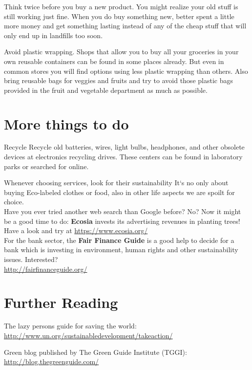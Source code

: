 \begin{suggest}{Think twice before you buy a new product.}
	You might realize your old stuff is still working just fine. When you do buy something new, better spent a little more money and get something lasting instead of any of the cheap stuff that will only end up in landfills too soon. 
\end{suggest} 

\begin{suggest}{Avoid plastic wrapping.}
	Shops that allow you to buy all your groceries in your own reusable containers can be found in some places already. But even in common stores you will find options using less plastic wrapping than others. Also bring reusable bags for veggies and fruits and try to avoid those plastic bags provided in the fruit and vegetable department as much as possible.
\end{suggest}

\section{More things to do}

\begin{suggest}{Recycle}
	Recycle old batteries, wires, light bulbs, headphones, and other obsolete devices at electronics recycling drives. These centers can be found in laboratory parks or searched for online.
\end{suggest}

\begin{suggest}{Whenever choosing services, look for their sustainability}
		It`s no only about buying Eco-labeled clothes or food, also in other life aspects we are spoilt for choice.\\
		Have you ever tried another web search than Google before? No? Now it might be a good time to do: \textbf{Ecosia} invests its advertising revenues in planting trees! Have a look and try at \url{https://www.ecosia.org/} \\
		For the bank sector, the \textbf{Fair Finance Guide} is a good help to decide for a bank which is investing in environment, human rights and other sustainability issues. Interested? \\ \url{http://fairfinanceguide.org/}
\end{suggest}



\section{Further Reading} 

\begin{suggest}{The lazy persons guide for saving the world:} 
\url{http://www.un.org/sustainabledevelopment/takeaction/}
\end{suggest}

\begin{suggest}{Green blog published by The Green Guide Institute (TGGI):}
\url{http://blog.thegreenguide.com/}
\end{suggest}
